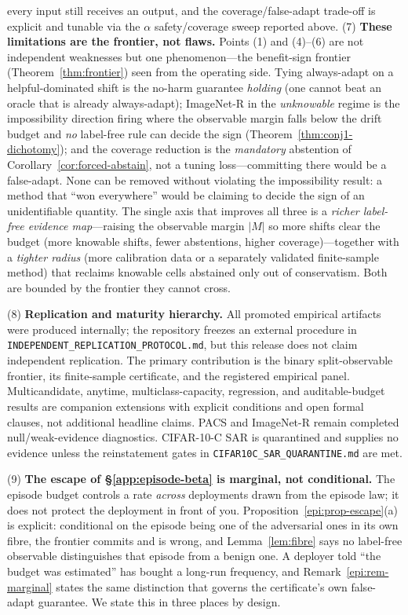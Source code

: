 \documentclass[conference]{IEEEtran}
\theoremstyle{plain}
\theoremstyle{definition}
\begin{document}
every input still receives an output, and the coverage/false-adapt trade-off is explicit and
tunable via the $\alpha$ safety/coverage sweep reported above.
(7) \textbf{These limitations are the frontier, not flaws.} Points (1) and (4)--(6) are not
independent weaknesses but one phenomenon---the benefit-sign frontier (Theorem~\ref{thm:frontier})
seen from the operating side. Tying always-adapt on a helpful-dominated shift is the no-harm
guarantee \emph{holding} (one cannot beat an oracle that is already always-adapt); ImageNet-R in the
\emph{unknowable} regime is the impossibility direction firing where the observable margin falls
below the drift budget and \emph{no} label-free rule can decide the sign
(Theorem~\ref{thm:conj1-dichotomy}); and the coverage reduction is the \emph{mandatory} abstention of
Corollary~\ref{cor:forced-abstain}, not a tuning loss---committing there would be a false-adapt. None
can be removed without violating the impossibility result: a method that ``won everywhere'' would be
claiming to decide the sign of an unidentifiable quantity. The single axis that improves all three is
a \emph{richer label-free evidence map}---raising the observable margin $|M|$ so more shifts clear the
budget (more knowable shifts, fewer abstentions, higher coverage)---together with a \emph{tighter
radius} (more calibration data or a separately validated finite-sample method) that reclaims knowable cells abstained only out of
conservatism. Both are bounded by the frontier they cannot cross.

(8) \textbf{Replication and maturity hierarchy.} All promoted empirical artifacts were produced
internally; the repository freezes an external procedure in
\texttt{INDEPENDENT\_REPLICATION\_PROTOCOL.md}, but this release does not claim independent
replication. The primary contribution is the binary split-observable frontier, its finite-sample
certificate, and the registered empirical panel. Multicandidate, anytime, multiclass-capacity,
regression, and auditable-budget results are companion extensions with explicit conditions and open
formal clauses, not additional headline claims. PACS and ImageNet-R remain completed null/weak-evidence
diagnostics. CIFAR-10-C SAR is quarantined and supplies no evidence unless the reinstatement gates in
\texttt{CIFAR10C\_SAR\_QUARANTINE.md} are met.

(9) \textbf{The escape of \S\ref{app:episode-beta} is marginal, not conditional.} The episode budget
controls a rate \emph{across} deployments drawn from the episode law; it does not protect the
deployment in front of you. Proposition~\ref{epi:prop-escape}(a) is explicit: conditional on the
episode being one of the adversarial ones in its own fibre, the frontier commits and is wrong, and
Lemma~\ref{lem:fibre} says no label-free observable distinguishes that episode from a benign one. A
deployer told ``the budget was estimated'' has bought a long-run frequency, and
Remark~\ref{epi:rem-marginal} states the same distinction that governs the certificate's own
false-adapt guarantee. We state this in three places by design.
\end{document}
